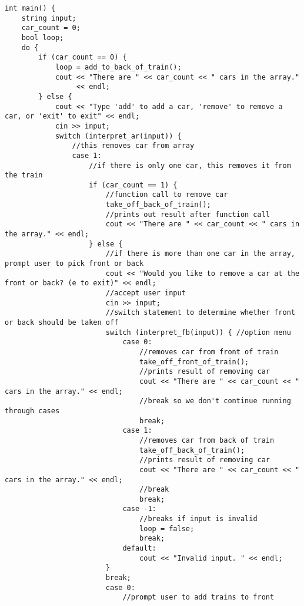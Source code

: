 \documentclass[11pt]{article}
\begin{document}
\begin{lstlisting}
int main() {
    string input;
    car_count = 0;
    bool loop;
    do {
        if (car_count == 0) {
            loop = add_to_back_of_train();
            cout << "There are " << car_count << " cars in the array."
                 << endl;
        } else {
            cout << "Type 'add' to add a car, 'remove' to remove a car, or 'exit' to exit" << endl;
            cin >> input;
            switch (interpret_ar(input)) {
                //this removes car from array
                case 1:
                    //if there is only one car, this removes it from the train
                    if (car_count == 1) {
                        //function call to remove car
                        take_off_back_of_train();
                        //prints out result after function call
                        cout << "There are " << car_count << " cars in the array." << endl;
                    } else {
                        //if there is more than one car in the array, prompt user to pick front or back
                        cout << "Would you like to remove a car at the front or back? (e to exit)" << endl;
                        //accept user input
                        cin >> input;
                        //switch statement to determine whether front or back should be taken off
                        switch (interpret_fb(input)) { //option menu
                            case 0:
                                //removes car from front of train
                                take_off_front_of_train();
                                //prints result of removing car
                                cout << "There are " << car_count << " cars in the array." << endl;
                                //break so we don't continue running through cases
                                break;
                            case 1:
                                //removes car from back of train
                                take_off_back_of_train();
                                //prints result of removing car
                                cout << "There are " << car_count << " cars in the array." << endl;
                                //break
                                break;
                            case -1:
                                //breaks if input is invalid
                                loop = false;
                                break;
                            default:
                                cout << "Invalid input. " << endl;
                        }
                        break;
                        case 0:
                            //prompt user to add trains to front

\end{lstlisting}
\end{document}
